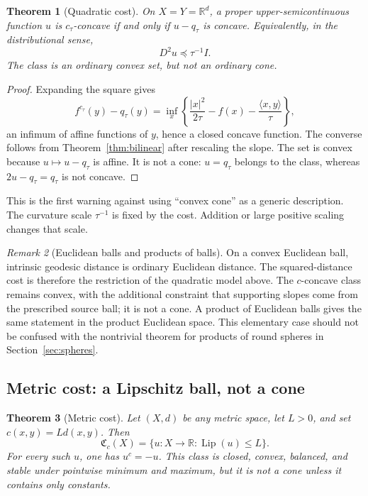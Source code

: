 \documentclass[11pt,a4paper]{article}
\newtheorem{theorem}{Theorem}[section]
\theoremstyle{definition}
\theoremstyle{remark}
\newtheorem{remark}[theorem]{Remark}
\newcommand{\R}{\mathbb R}
\newcommand{\Cfrak}{\mathfrak C}
\newcommand{\Lip}{\operatorname{Lip}}
\begin{document}
\begin{theorem}[Quadratic cost]\label{thm:quadratic}
On $X=Y=\R^d$, a proper upper-semicontinuous function $u$ is
$c_\tau$-concave if and only if $u-q_\tau$ is concave. Equivalently, in the
distributional sense,
\[
  D^2u\preccurlyeq \tau^{-1}I.
\]
The class is an ordinary convex set, but not an ordinary cone.
\end{theorem}

\begin{proof}
Expanding the square gives
\[
  f^{c_\tau}(y)-q_\tau(y)
  =\inf_x\left\{\frac{\lvert x\rvert^2}{2\tau}-f(x)
                 -\frac{\langle x,y\rangle}{\tau}\right\},
\]
an infimum of affine functions of $y$, hence a closed concave function. The
converse follows from Theorem~\ref{thm:bilinear} after rescaling the slope.
The set is convex because $u\mapsto u-q_\tau$ is affine. It is not a cone:
$u=q_\tau$ belongs to the class, whereas $2u-q_\tau=q_\tau$ is not concave.
\end{proof}

This is the first warning against using ``convex cone'' as a generic
description. The curvature scale $\tau^{-1}$ is fixed by the cost. Addition or
large positive scaling changes that scale.

\begin{remark}[Euclidean balls and products of balls]
On a convex Euclidean ball, intrinsic geodesic distance is ordinary Euclidean
distance. The squared-distance cost is therefore the restriction of the
quadratic model above. The $c$-concave class remains convex, with the additional
constraint that supporting slopes come from the prescribed source ball; it is
not a cone. A product of Euclidean balls gives the same statement in the
product Euclidean space. This elementary case should not be confused with the
nontrivial theorem for products of round spheres in Section~\ref{sec:spheres}.
\end{remark}

\subsection{Metric cost: a Lipschitz ball, not a cone}

\begin{theorem}[Metric cost]\label{thm:metric}
Let $(X,d)$ be any metric space, let $L>0$, and set $c(x,y)=Ld(x,y)$. Then
\[
  \Cfrak_c(X)=\{u:X\to\R:\Lip(u)\leq L\}.
\]
For every such $u$, one has $u^c=-u$. This class is closed, convex, balanced,
and stable under pointwise minimum and maximum, but it is not a cone unless it
contains only constants.
\end{theorem}
\end{document}
